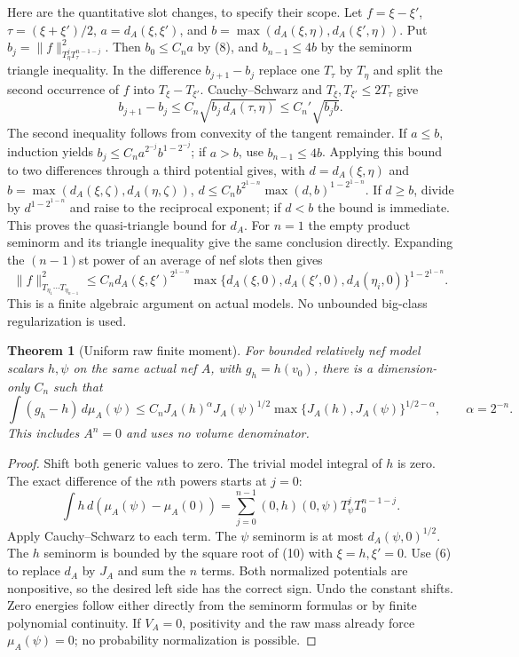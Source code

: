 \documentclass[10pt]{article}
\newtheorem{theorem}{Theorem}[section]
\begin{document}
Here are the quantitative slot changes, to specify their scope.
Let $f=\xi-\xi'$, $\tau=(\xi+\xi')/2$,
$a=d_A(\xi,\xi')$, and
$b=\max(d_A(\xi,\eta),d_A(\xi',\eta))$.
Put $b_j=\|f\|_{T_\eta^jT_\tau^{n-1-j}}^2$.
Then $b_0\leq C_na$ by (8), and $b_{n-1}\leq4b$ by the
seminorm triangle inequality. In the difference $b_{j+1}-b_j$ replace
one $T_\tau$ by $T_\eta$ and split the second occurrence of $f$
into $T_\xi-T_{\xi'}$. Cauchy--Schwarz and
$T_\xi,T_{\xi'}\leq2T_\tau$ give
\[
 b_{j+1}-b_j\leq C_n\sqrt{b_j\,d_A(\tau,\eta)}
                    \leq C_n'\sqrt{b_jb}.                  \tag{9}
\]
The second inequality follows from convexity of the tangent remainder.
If $a\leq b$, induction yields
$b_j\leq C_na^{2^{-j}}b^{1-2^{-j}}$; if $a>b$, use
$b_{n-1}\leq4b$.
Applying this bound to two differences through a third potential gives,
with $d=d_A(\xi,\eta)$ and
$b=\max(d_A(\xi,\zeta),d_A(\eta,\zeta))$,
$d\leq C_n b^{2^{1-n}}\max(d,b)^{1-2^{1-n}}$.
If $d\geq b$, divide by $d^{1-2^{1-n}}$ and raise to the reciprocal
exponent; if $d<b$ the bound is immediate. This proves the
quasi-triangle bound for $d_A$.
For $n=1$ the empty product seminorm and its triangle inequality give
the same conclusion directly. Expanding the $(n-1)$st power of an
average of nef slots then gives
\[
 \|f\|_{T_{\eta_1}\cdots T_{\eta_{n-1}}}^2
 \leq C_n d_A(\xi,\xi')^{2^{1-n}}
 \max\{d_A(\xi,0),d_A(\xi',0),d_A(\eta_i,0)\}^{1-2^{1-n}}.
                                                               \tag{10}
\]
This is a finite algebraic argument on actual models. No unbounded
big-class regularization is used.

\begin{theorem}[Uniform raw finite moment]\label{moment}
For bounded relatively nef model scalars $h,\psi$ on the same actual
nef $A$, with $g_h=h(v_0)$, there is a dimension-only $C_n$ such that
\[
 \int(g_h-h)\,d\mu_A(\psi)
 \leq C_n J_A(h)^{\alpha}J_A(\psi)^{1/2}
         \max\{J_A(h),J_A(\psi)\}^{1/2-\alpha},
 \qquad\alpha=2^{-n}.                                     \tag{11}
\]
This includes $A^n=0$ and uses no volume denominator.
\end{theorem}
\begin{proof}
Shift both generic values to zero. The trivial model integral of $h$
is zero. The exact difference of the $n$th powers starts at $j=0$:
\[
 \int h\,d(\mu_A(\psi)-\mu_A(0))
 =\sum_{j=0}^{n-1}(0,h)(0,\psi)T_\psi^jT_0^{n-1-j}.
\]
Apply Cauchy--Schwarz to each term. The $\psi$ seminorm is at most
$d_A(\psi,0)^{1/2}$. The $h$ seminorm is bounded by the square root
of (10) with $\xi=h,\xi'=0$. Use (6) to replace $d_A$ by $J_A$
and sum the $n$ terms. Both normalized potentials are nonpositive,
so the desired left side has the correct sign.
Undo the constant shifts. Zero energies follow either directly from
the seminorm formulas or by finite polynomial continuity.
If $V_A=0$, positivity and the raw mass already force
$\mu_A(\psi)=0$; no probability normalization is possible.
\end{proof}
\end{document}
